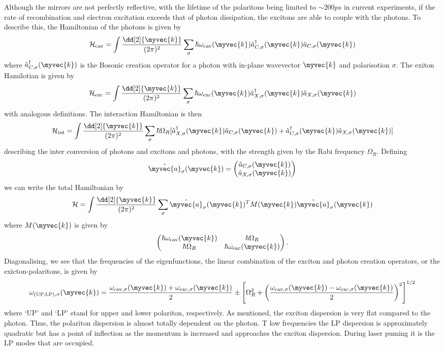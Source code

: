 Although the mirrors are not perfectly reflective,
with the lifetime of the polaritons being limited to $\sim 200 ps$ in current experiments, if the rate of recombination and electron excitation exceeds that of photon dissipation,
the excitons are able to couple with the photons. To describe this, the Hamiltonian of the photons is given by 
\[
\mathcal{H}_{\text{cav}} = \int \frac{\dd[2]{\myvec{k}}}{(2\pi)^2} \sum_\sigma 
\hbar\omega_{\text{cav}}(\myvec{k})\hat{a}^\dagger_{C,\sigma}(\myvec{k})\hat{a}_{C,\sigma}(\myvec{k})
\]
where $\hat{a}^\dagger_{C,\sigma}(\myvec{k})$ is the Bosonic creation operator for a photon with in-plane wavevector $\myvec{k}$ and polarisotion $\sigma.$ The exiton Hamilotian is given by 
\[
\mathcal{H}_{\text{exc}} = \int \frac{\dd[2]{\myvec{k}}}{(2\pi)^2} \sum_\sigma 
\hbar\omega_{\text{exc}}(\myvec{k})\hat{a}^\dagger_{X,\sigma}(\myvec{k})\hat{a}_{X,\sigma}(\myvec{k})
\]
with analogous definitions. The interaction Hamiltonian is then 
\[
\mathcal{H}_{\text{int}} = \int \frac{\dd[2]{\myvec{k}}}{(2\pi)^2} \sum_\sigma \hbar \Omega_R [ \hat{a}^\dagger_{X,\sigma}(\myvec{k})\hat{a}_{C,\sigma}(\myvec{k}) + \hat{a}^\dagger_{C,\sigma}(\myvec{k})\hat{a}_{X,\sigma}(\myvec{k})]
\]
describing the inter conversion of photons and excitons and photons, with the strength given by the Rabi frequency $\Omega_R$. Defining 
\[
\hat{\myvec{a}}_\sigma(\myvec{k}) = 
\begin{pmatrix}
\hat{a}_{C, \sigma}(\myvec{k}) \\
\hat{a}_{X,\sigma}(\myvec{k})
\end{pmatrix}
\]
we can write the total Hamiltonian by 
\[
\mathcal{H} = \int \frac{\dd[2]{\myvec{k}}}{(2\pi)^2} \sum_\sigma \hat{\myvec{a}}_\sigma (\myvec{k})^TM(\myvec{k}) \hat{\myvec{a}}_\sigma(\myvec{k})
\]
where $M(\myvec{k})$ is given by 
\[
\begin{pmatrix}
\hbar\omega_{\text{cav}}(\myvec{k}) & \hbar \Omega_R \\
\hbar \Omega_R & \hbar\omega_{\text{exc}}(\myvec{k})
\end{pmatrix}.
\]
Diagonalising, we see that the frequencies of the eigenfunctions, the linear combination of the exciton and photon creation operators, or the exicton-polaritons, is given by
\[
\omega_{\text{(UP,LP)},\sigma}(\myvec{k}) = \frac{\omega_{\text{cav},\sigma}(\myvec{k}) + \omega_{\text{exc},\sigma}(\myvec{k})}{2} \pm \left[ \Omega_R^2 + \left(\frac{\omega_{\text{cav},\sigma}(\myvec{k}) - \omega_{\text{exc},\sigma}(\myvec{k})}{2}\right)^2\right]^{1/2}
\]
where `UP' and `LP' stand for upper and lower polariton, respectively. As mentioned, the exciton dispersion is very flat compared to the photon. Thus, the polariton dispersion is almost totally dependent on the photon. T low frequencies the LP dispersion is approximately quadratic but has a point of inflection as the momentum is increased and approaches the exciton dispersion. During laser puming it is the LP modes that are occupied. 

